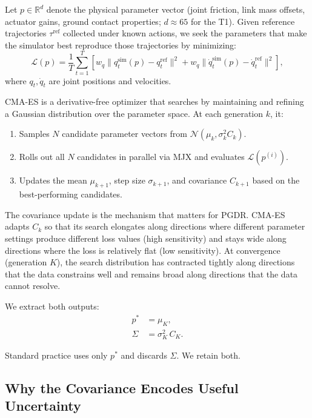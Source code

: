 \documentclass[10pt,twocolumn]{article}
\begin{document}
Let $p \in \mathbb{R}^d$ denote the physical parameter vector (joint friction, link mass offsets, actuator gains, ground contact properties; $d \approx 65$ for the T1).
Given reference trajectories $\tau^{\mathrm{ref}}$ collected under known actions, we seek the parameters that make the simulator best reproduce those trajectories by minimizing:
\begin{equation}
    \mathcal{L}(p) = \frac{1}{T}\sum_{t=1}^{T} \left[ w_q \| q_t^{\mathrm{sim}}(p) - q_t^{\mathrm{ref}} \|^2 + w_{\dot{q}} \| \dot{q}_t^{\mathrm{sim}}(p) - \dot{q}_t^{\mathrm{ref}} \|^2 \right],
    \label{eq:loss}
\end{equation}
where $q_t, \dot{q}_t$ are joint positions and velocities.

CMA-ES is a derivative-free optimizer that searches by maintaining and refining a Gaussian distribution over the parameter space.
At each generation $k$, it:
\begin{enumerate}
    \item Samples $N$ candidate parameter vectors from $\mathcal{N}(\mu_k, \sigma_k^2 C_k)$.
    \item Rolls out all $N$ candidates in parallel via MJX and evaluates $\mathcal{L}(p^{(i)})$.
    \item Updates the mean $\mu_{k+1}$, step size $\sigma_{k+1}$, and covariance $C_{k+1}$ based on the best-performing candidates.
\end{enumerate}

The covariance update is the mechanism that matters for PGDR.
CMA-ES adapts $C_k$ so that its search elongates along directions where different parameter settings produce different loss values (high sensitivity) and stays wide along directions where the loss is relatively flat (low sensitivity).
At convergence (generation $K$), the search distribution has contracted tightly along directions that the data constrains well and remains broad along directions that the data cannot resolve.

We extract both outputs:
\begin{align}
    p^* &= \mu_K, \label{eq:pstar} \\
    \Sigma &= \sigma_K^2 \, C_K. \label{eq:sigma}
\end{align}

Standard practice uses only $p^*$ and discards $\Sigma$.
We retain both.

\subsection{Why the Covariance Encodes Useful Uncertainty}
\end{document}
